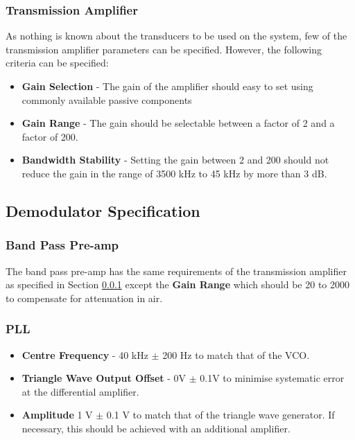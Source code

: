 \subsubsection{Transmission Amplifier}
\label{sec:specificationTransmissionAmplifier}
As nothing is known about the transducers to be used on the system, few of the transmission amplifier parameters can be specified.
However, the following criteria can be specified:
\begin{itemize}
    \item \textbf{Gain Selection} - The gain of the amplifier should easy to set using commonly available passive components
    \item \textbf{Gain Range} - The gain should be selectable between a factor of 2 and a factor of 200.
    \item \textbf{Bandwidth Stability} - Setting the gain between 2 and 200 should not reduce the gain in the range of 3500 kHz to 45 kHz by more than 3 dB.
\end{itemize} 

\subsection{Demodulator Specification}

\subsubsection{Band Pass Pre-amp}
The band pass pre-amp has the same requirements of the transmission amplifier as specified in Section \ref{sec:specificationTransmissionAmplifier} except the \textbf{Gain Range} which should be 20 to 2000 to compensate for attenuation in air.  

\subsubsection{PLL}
\begin{itemize}
    \item \textbf{Centre Frequency} - 40 kHz $\pm$ 200 Hz to match that of the VCO.
    \item \textbf{Triangle Wave Output Offset} - 0V $\pm$ 0.1V to minimise systematic error at the differential amplifier.
    \item \textbf{Amplitude} 1 V $\pm$ 0.1 V to match that of the triangle wave generator.
    If necessary, this should be achieved with an additional amplifier. 
\end{itemize}

